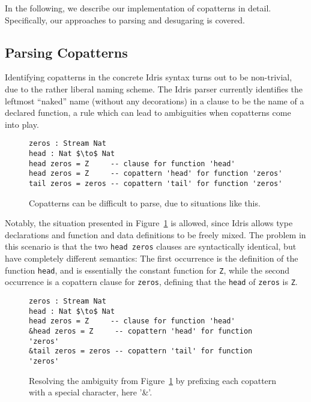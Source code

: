 In the following, we describe our implementation of copatterns in
detail. Specifically, our approaches to parsing and desugaring is covered. 

\subsection{Parsing Copatterns}
\label{sec:parsing-copatterns}
Identifying copatterns in the concrete Idris syntax turns out to be non-trivial,
due to the rather liberal naming scheme. The Idris parser currently identifies
the leftmost ``naked'' name (without any decorations) in a clause to be the name
of a declared function, a rule which can lead to ambiguities when copatterns
come into play.
\begin{figure}[H]
\begin{lstlisting}[mathescape,title=\idrisBlock]
zeros : Stream Nat
head : Nat $\to$ Nat
head zeros = Z     -- clause for function 'head'
head zeros = Z     -- copattern 'head' for function 'zeros'
tail zeros = zeros -- copattern 'tail' for function 'zeros'
\end{lstlisting}
  \caption{Copatterns can be difficult to parse, due to situations like
    this.}
  \label{fig:copatterns_parsing_hell}
\end{figure}
Notably, the situation presented in
Figure~\ref{fig:copatterns_parsing_hell} is allowed, since Idris allows type
declarations and function and data definitions to be freely mixed. The problem in this scenario is
that the two \texttt{head zeros} clauses are syntactically identical, but have
completely different semantics: The first occurrence is the definition of the
function \texttt{head}, and is essentially the constant function for \texttt{Z},
while the second occurrence is a copattern clause for \texttt{zeros}, defining
that the \texttt{head} of \texttt{zeros} is \texttt{Z}.
\begin{figure}[H]
\begin{lstlisting}[mathescape,title=\idrisBlock]
zeros : Stream Nat
head : Nat $\to$ Nat
head zeros = Z     -- clause for function 'head'
&head zeros = Z     -- copattern 'head' for function 'zeros'
&tail zeros = zeros -- copattern 'tail' for function 'zeros'
\end{lstlisting}
  \caption{Resolving the ambiguity from Figure~\ref{fig:copatterns_parsing_hell}
  by prefixing each copattern with a special character, here '\&'.}
  \label{fig:copatterns_parsing_hell_fixed_ampersand}
\end{figure}
